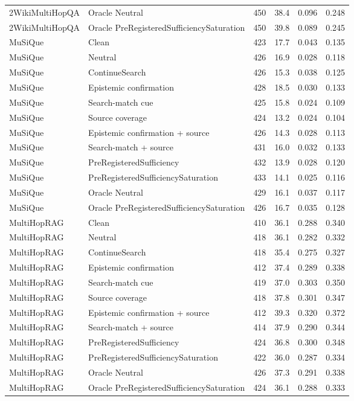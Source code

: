 \begin{table}[t]
\begin{tabular}{llrrrr}
2WikiMultiHopQA & Oracle Neutral & 450 & 38.4 & 0.096 & 0.248 \\
2WikiMultiHopQA & Oracle PreRegisteredSufficiencySaturation & 450 & 39.8 & 0.089 & 0.245 \\
MuSiQue & Clean & 423 & 17.7 & 0.043 & 0.135 \\
MuSiQue & Neutral & 426 & 16.9 & 0.028 & 0.118 \\
MuSiQue & ContinueSearch & 426 & 15.3 & 0.038 & 0.125 \\
MuSiQue & Epistemic confirmation & 428 & 18.5 & 0.030 & 0.133 \\
MuSiQue & Search-match cue & 425 & 15.8 & 0.024 & 0.109 \\
MuSiQue & Source coverage & 424 & 13.2 & 0.024 & 0.104 \\
MuSiQue & Epistemic confirmation + source & 426 & 14.3 & 0.028 & 0.113 \\
MuSiQue & Search-match + source & 431 & 16.0 & 0.032 & 0.133 \\
MuSiQue & PreRegisteredSufficiency & 432 & 13.9 & 0.028 & 0.120 \\
MuSiQue & PreRegisteredSufficiencySaturation & 433 & 14.1 & 0.025 & 0.116 \\
MuSiQue & Oracle Neutral & 429 & 16.1 & 0.037 & 0.117 \\
MuSiQue & Oracle PreRegisteredSufficiencySaturation & 426 & 16.7 & 0.035 & 0.128 \\
MultiHopRAG & Clean & 410 & 36.1 & 0.288 & 0.340 \\
MultiHopRAG & Neutral & 418 & 36.1 & 0.282 & 0.332 \\
MultiHopRAG & ContinueSearch & 418 & 35.4 & 0.275 & 0.327 \\
MultiHopRAG & Epistemic confirmation & 412 & 37.4 & 0.289 & 0.338 \\
MultiHopRAG & Search-match cue & 419 & 37.0 & 0.303 & 0.350 \\
MultiHopRAG & Source coverage & 418 & 37.8 & 0.301 & 0.347 \\
MultiHopRAG & Epistemic confirmation + source & 412 & 39.3 & 0.320 & 0.372 \\
MultiHopRAG & Search-match + source & 414 & 37.9 & 0.290 & 0.344 \\
MultiHopRAG & PreRegisteredSufficiency & 424 & 36.8 & 0.300 & 0.348 \\
MultiHopRAG & PreRegisteredSufficiencySaturation & 422 & 36.0 & 0.287 & 0.334 \\
MultiHopRAG & Oracle Neutral & 426 & 37.3 & 0.291 & 0.338 \\
MultiHopRAG & Oracle PreRegisteredSufficiencySaturation & 424 & 36.1 & 0.288 & 0.333 \\
\bottomrule
\end{tabular}
\end{table}
